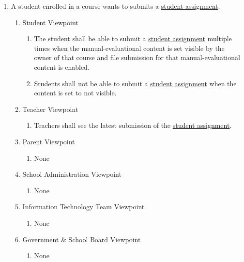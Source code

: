 \documentclass[]{article}
\begin{document}
\begin{enumerate}[{BE}1.]
	\item A student enrolled in a course wants to submits a \underline{student assignment}.
	\begin{enumerate}[{VP2}.1]
		\item Student Viewpoint
			\begin{enumerate}
				\item The student shall be able to submit a \underline{student assignment}
multiple times when the manual-evaluational content is set visible by the
owner of that course and file submission for that manual-evaluational content is
enabled.
\item Students shall not be able to submit a \underline{student assignment} when
the content is set to not visible.
			\end{enumerate}
		\item Teacher Viewpoint
			\begin{enumerate}
				\item Teachers shall see the latest submission of the \underline{student
assignment}.
			\end{enumerate}
		\item Parent Viewpoint
			\begin{enumerate}
				\item None
			\end{enumerate}
		\item School Administration Viewpoint
			\begin{enumerate}
				\item None
			\end{enumerate}
		\item Information Technology Team Viewpoint
			\begin{enumerate}
				\item None
			\end{enumerate}
		\item Government \& School Board Viewpoint
			\begin{enumerate}
				\item None
			\end{enumerate}
	\end{enumerate}


\end{enumerate}
\end{document}
